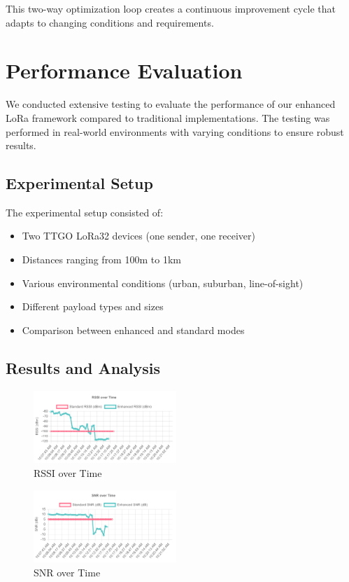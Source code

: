 \documentclass[conference]{IEEEtran}
\begin{document}
This two-way optimization loop creates a continuous improvement cycle that adapts to changing conditions and requirements.

\section{Performance Evaluation}
We conducted extensive testing to evaluate the performance of our enhanced LoRa framework compared to traditional implementations. The testing was performed in real-world environments with varying conditions to ensure robust results.

\subsection{Experimental Setup}
The experimental setup consisted of:
\begin{itemize}
    \item Two TTGO LoRa32 devices (one sender, one receiver)
    \item Distances ranging from 100m to 1km
    \item Various environmental conditions (urban, suburban, line-of-sight)
    \item Different payload types and sizes
    \item Comparison between enhanced and standard modes
\end{itemize}

\subsection{Results and Analysis}

\begin{figure}[htbp]
\centering
\includegraphics[width=0.48\textwidth]{images/rssi-over-time.png}
\caption{RSSI over Time}
\label{fig:rssi_time}
\end{figure}

\begin{figure}[htbp]
\centering
\includegraphics[width=0.48\textwidth]{images/snr-over-time.png}
\caption{SNR over Time}
\label{fig:snr_time}
\end{figure}
\end{document}
